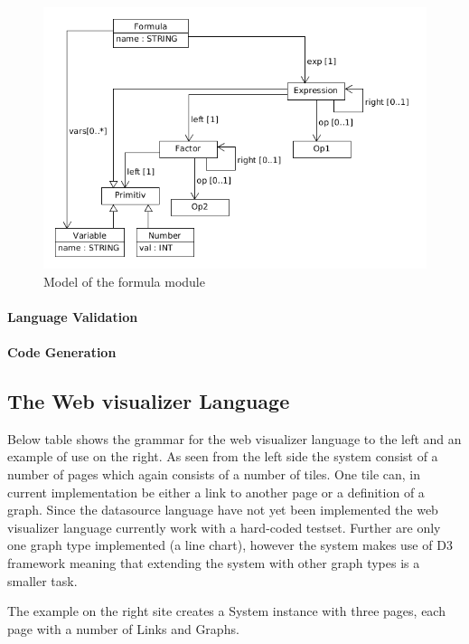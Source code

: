 \begin{figure}
  \begin{center}
  \includegraphics[width=\linewidth]{images/MetaFormula}
  \end{center}
  \caption{Model of the formula module}
  \label{fig:formulaModel}
\end{figure}
\paragraph{Language Validation}

\paragraph{Code Generation}


\subsection{The Web visualizer Language}
Below table shows the grammar for the web visualizer language to the left and an example of use on the right. 
As seen from the left side the system consist of a number of pages which again consists of a number of tiles. 
One tile can, in current implementation be either a link to another page or a definition of a graph. 
Since the datasource language have not yet been implemented the web visualizer language currently work with a hard-coded testset. 
Further are only one graph type implemented (a line chart), however the system makes use of D3 framework meaning that extending the system with other graph types is a smaller task.


The example on the right site creates a System instance with three pages, each page with a number of Links and Graphs.

